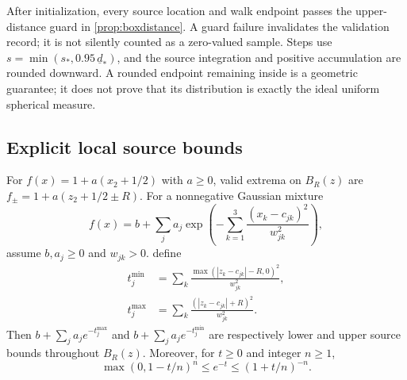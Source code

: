 After initialization, every source location and walk endpoint passes the
upper-distance guard in \cref{prop:boxdistance}. A guard failure invalidates
the validation record; it is not silently counted as a zero-valued sample.
Steps use $s=\min(s_*,0.95\,\underline d_*)$, and the source integration
and positive accumulation are rounded downward. A rounded endpoint remaining
inside is a geometric guarantee; it does not prove that its distribution
is exactly the ideal uniform spherical measure.

\subsection{Explicit local source bounds}

\begin{proposition}
\label{prop:sourcesenclosed}
For $f(x)=1+a(x_2+1/2)$ with $a\ge0$, valid extrema on $B_R(z)$ are
$f_\pm=1+a(z_2+1/2\pm R)$. For a nonnegative Gaussian mixture
\[
 f(x)=b+\sum_j a_j\exp\!\left(-\sum_{k=1}^3
                     \frac{(x_k-c_{jk})^2}{w_{jk}^2}\right),
\]
assume $b,a_j\ge0$ and $w_{jk}>0$.
define
\begin{align*}
 t_j^{\min}&=\sum_k\frac{\max(|z_k-c_{jk}|-R,0)^2}{w_{jk}^2},\\
 t_j^{\max}&=\sum_k\frac{(|z_k-c_{jk}|+R)^2}{w_{jk}^2}.
\end{align*}
Then $b+\sum_j a_j e^{-t_j^{\max}}$ and
$b+\sum_j a_j e^{-t_j^{\min}}$ are respectively lower and upper source
bounds throughout $B_R(z)$. Moreover, for $t\ge0$ and integer $n\ge1$,
\begin{equation}
 \max(0,1-t/n)^n\le e^{-t}\le(1+t/n)^{-n}.
 \label{eq:rationalexpenclosure}
\end{equation}
\end{proposition}
